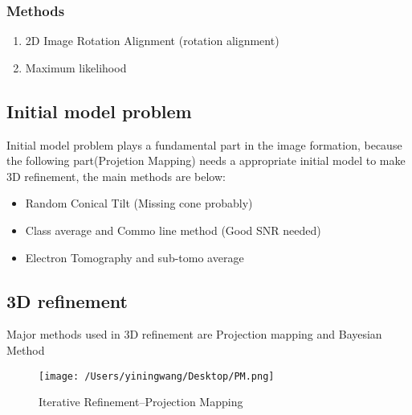 \documentclass{article}
\begin{document}
   \subsubsection{Methods}
   \begin{center}
    \begin{enumerate}
       \item 2D Image Rotation Alignment (rotation alignment)
       \item Maximum likelihood
   \end{enumerate} 
\end{center}

    \subsection{Initial model problem}
    Initial model problem plays a fundamental part in the image formation, because the following 
    part(Projetion Mapping)
    needs a appropriate initial model to make 3D refinement, the main methods are below:
    \begin{center}
        \begin{itemize}
           \item Random Conical Tilt (Missing cone probably)
           \item Class average and Commo line method  (Good SNR needed)
           \item Electron Tomography and sub-tomo average
       \end{itemize} 
    \end{center}

    \subsection{3D refinement}
    Major methods used in 3D refinement are Projection mapping and Bayesian Method 
    \begin{figure}[h]
        \centering
        \texttt{[image: /Users/yiningwang/Desktop/PM.png]} 
        \caption{\small Iterative Refinement--Projection Mapping}
    \end{figure}
\end{document}
